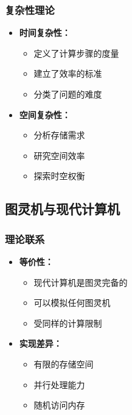 \documentclass[a4paper,12pt]{ctexart}
\begin{document}
\subsubsection{复杂性理论}
\begin{itemize}
    \item \textbf{时间复杂性：}
        \begin{itemize}
            \item 定义了计算步骤的度量
            \item 建立了效率的标准
            \item 分类了问题的难度
        \end{itemize}
    \item \textbf{空间复杂性：}
        \begin{itemize}
            \item 分析存储需求
            \item 研究空间效率
            \item 探索时空权衡
        \end{itemize}
\end{itemize}

\subsection{图灵机与现代计算机}
\subsubsection{理论联系}
\begin{itemize}
    \item \textbf{等价性：}
        \begin{itemize}
            \item 现代计算机是图灵完备的
            \item 可以模拟任何图灵机
            \item 受同样的计算限制
        \end{itemize}
    \item \textbf{实现差异：}
        \begin{itemize}
            \item 有限的存储空间
            \item 并行处理能力
            \item 随机访问内存
        \end{itemize}
\end{itemize}
\end{document}
